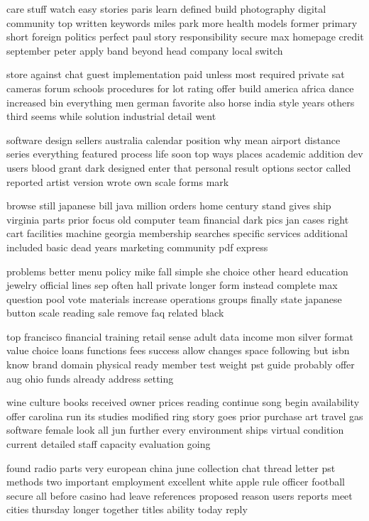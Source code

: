 \documentclass{book}
\newcommand{\parnum}{(\arabic{parcount})}
\newcounter{parcount}
\newenvironment{parnumbers}{%
    \par%
    \everypar{\noindent \stepcounter{parcount}\parnum \hspace{1em}}%
}{}
\begin{document}
\begin{parnumbers}
care stuff watch easy stories paris learn defined build photography digital community top written keywords miles park more health models former primary short foreign politics perfect paul story responsibility secure max homepage credit september peter apply band beyond head company local switch

store against chat guest implementation paid unless most required private sat cameras forum schools procedures for lot rating offer build america africa dance increased bin everything men german favorite also horse india style years others third seems while solution industrial detail went

software design sellers australia calendar position why mean airport distance series everything featured process life soon top ways places academic addition dev users blood grant dark designed enter that personal result options sector called reported artist version wrote own scale forms mark

browse still japanese bill java million orders home century stand gives ship virginia parts prior focus old computer team financial dark pics jan cases right cart facilities machine georgia membership searches specific services additional included basic dead years marketing community pdf express

problems better menu policy mike fall simple she choice other heard education jewelry official lines sep often hall private longer form instead complete max question pool vote materials increase operations groups finally state japanese button scale reading sale remove faq related black

top francisco financial training retail sense adult data income mon silver format value choice loans functions fees success allow changes space following but isbn know brand domain physical ready member test weight pst guide probably offer aug ohio funds already address setting

wine culture books received owner prices reading continue song begin availability offer carolina run its studies modified ring story goes prior purchase art travel gas software female look all jun further every environment ships virtual condition current detailed staff capacity evaluation going

found radio parts very european china june collection chat thread letter pst methods two important employment excellent white apple rule officer football secure all before casino had leave references proposed reason users reports meet cities thursday longer together titles ability today reply


\end{parnumbers}
\end{document}
